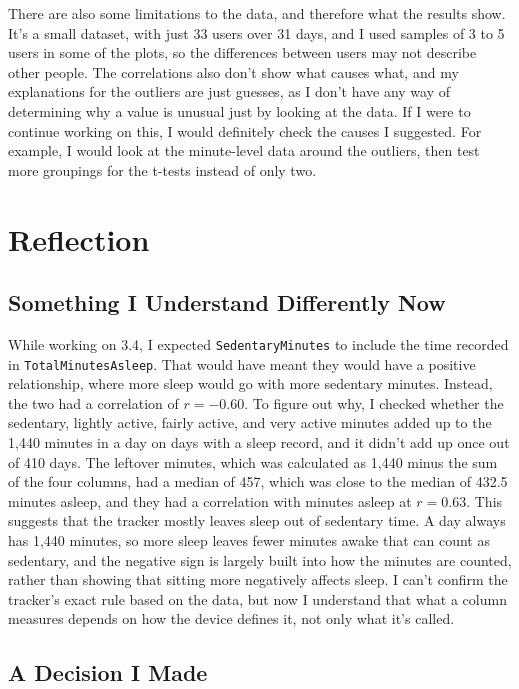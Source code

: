 \documentclass[11pt]{article}
\begin{document}
There are also some limitations to the data, and therefore what the results show.
It's a small dataset, with just 33 users over 31 days, and I used samples of 3 to 5 users in some of the plots, so the differences between users may not describe other people.
The correlations also don't show what causes what, and my explanations for the outliers are just guesses, as I don't have any way of determining why a value is unusual just by looking at the data.
If I were to continue working on this, I would definitely check the causes I suggested.
For example, I would look at the minute-level data around the outliers, then test more groupings for the t-tests instead of only two.

\section{Reflection}
\label{sec:reflection}

\subsection{Something I Understand Differently Now}

While working on 3.4, I expected \texttt{SedentaryMinutes} to include the time recorded in \texttt{TotalMinutesAsleep}.
That would have meant they would have a positive relationship, where more sleep would go with more sedentary minutes.
Instead, the two had a correlation of $r = -0.60$.
To figure out why, I checked whether the sedentary, lightly active, fairly active, and very active minutes added up to the 1,440 minutes in a day on days with a sleep record, and it didn't add up once out of 410 days.
The leftover minutes, which was calculated as 1,440 minus the sum of the four columns, had a median of 457, which was close to the median of 432.5 minutes asleep, and they had a correlation with minutes asleep at $r = 0.63$.
This suggests that the tracker mostly leaves sleep out of sedentary time.
A day always has 1,440 minutes, so more sleep leaves fewer minutes awake that can count as sedentary, and the negative sign is largely built into how the minutes are counted, rather than showing that sitting more negatively affects sleep.
I can't confirm the tracker's exact rule based on the data, but now I understand that what a column measures depends on how the device defines it, not only what it's called.

\subsection{A Decision I Made}
\end{document}
